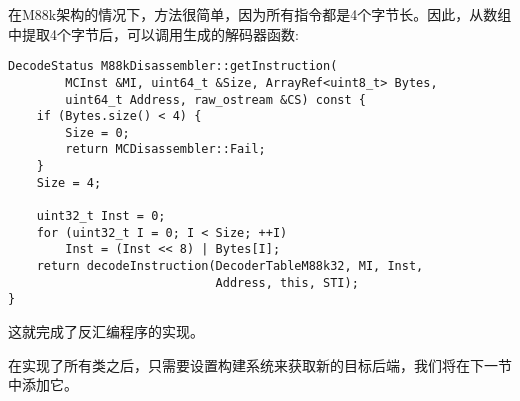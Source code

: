在M88k架构的情况下，方法很简单，因为所有指令都是4个字节长。因此，从数组中提取4个字节后，可以调用生成的解码器函数:\par

\begin{lstlisting}[caption={}]
DecodeStatus M88kDisassembler::getInstruction(
		MCInst &MI, uint64_t &Size, ArrayRef<uint8_t> Bytes,
		uint64_t Address, raw_ostream &CS) const {
	if (Bytes.size() < 4) {
		Size = 0;
		return MCDisassembler::Fail;
	}
	Size = 4;
	
	uint32_t Inst = 0;
	for (uint32_t I = 0; I < Size; ++I)
		Inst = (Inst << 8) | Bytes[I];
	return decodeInstruction(DecoderTableM88k32, MI, Inst,
							 Address, this, STI);
}
\end{lstlisting}

这就完成了反汇编程序的实现。\par

在实现了所有类之后，只需要设置构建系统来获取新的目标后端，我们将在下一节中添加它。\par





























